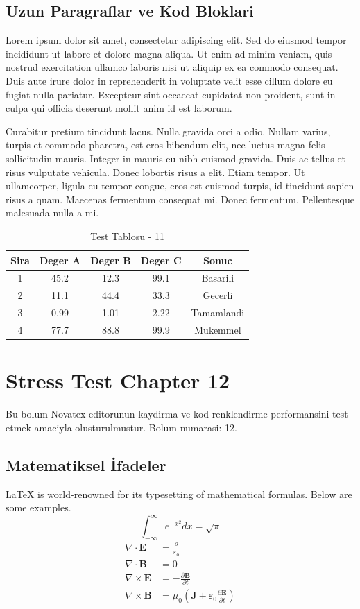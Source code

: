 \documentclass[12pt,a4paper]{article}
\begin{document}
\subsection{Uzun Paragraflar ve Kod Bloklari}
Lorem ipsum dolor sit amet, consectetur adipiscing elit. Sed do eiusmod tempor incididunt ut labore et dolore magna aliqua. Ut enim ad minim veniam, quis nostrud exercitation ullamco laboris nisi ut aliquip ex ea commodo consequat. Duis aute irure dolor in reprehenderit in voluptate velit esse cillum dolore eu fugiat nulla pariatur. Excepteur sint occaecat cupidatat non proident, sunt in culpa qui officia deserunt mollit anim id est laborum.

Curabitur pretium tincidunt lacus. Nulla gravida orci a odio. Nullam varius, turpis et commodo pharetra, est eros bibendum elit, nec luctus magna felis sollicitudin mauris. Integer in mauris eu nibh euismod gravida. Duis ac tellus et risus vulputate vehicula. Donec lobortis risus a elit. Etiam tempor. Ut ullamcorper, ligula eu tempor congue, eros est euismod turpis, id tincidunt sapien risus a quam. Maecenas fermentum consequat mi. Donec fermentum. Pellentesque malesuada nulla a mi.

\begin{table}[h!]
\centering
\begin{tabular}{|c|c|c|c|c|}
\hline
\textbf{Sira} & \textbf{Deger A} & \textbf{Deger B} & \textbf{Deger C} & \textbf{Sonuc} \\
\hline
1 & 45.2 & 12.3 & 99.1 & Basarili \\
2 & 11.1 & 44.4 & 33.3 & Gecerli \\
3 & 0.99 & 1.01 & 2.22 & Tamamlandi \\
4 & 77.7 & 88.8 & 99.9 & Mukemmel \\
\hline
\end{tabular}
\caption{Test Tablosu - 11}
\end{table}

\newpage
\section{Stress Test Chapter 12}
Bu bolum Novatex editorunun kaydirma ve kod renklendirme performansini test etmek amaciyla olusturulmustur. Bolum numarasi: 12.

\subsection{Matematiksel İfadeler}
\LaTeX{} is world-renowned for its typesetting of mathematical formulas. Below are some examples.
\begin{equation}
\int_{-\infty}^{\infty} e^{-x^2} dx = \sqrt{\pi}
\end{equation}
\begin{align}
\nabla \cdot \mathbf{E} &= \frac{\rho}{\varepsilon_0} \\
\nabla \cdot \mathbf{B} &= 0 \\
\nabla \times \mathbf{E} &= -\frac{\partial \mathbf{B}}{\partial t} \\
\nabla \times \mathbf{B} &= \mu_0\left(\mathbf{J} + \varepsilon_0 \frac{\partial \mathbf{E}}{\partial t}\right)
\end{align}
\end{document}
